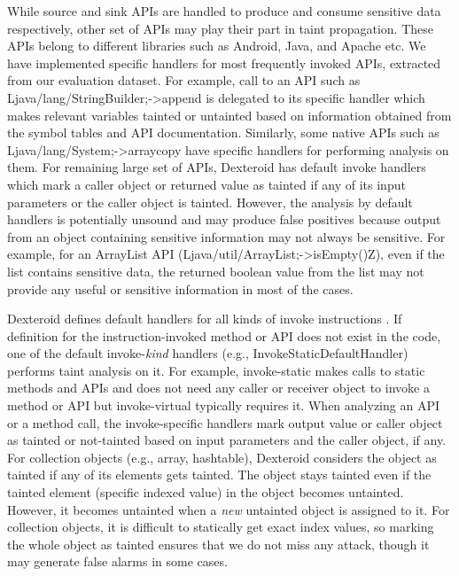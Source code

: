 \documentclass[10pt]{elsarticle}
\begin{document}
While source and sink APIs are handled to produce and consume sensitive data respectively, other set of APIs may play their part in taint propagation. These APIs belong to different libraries such as Android, Java, and Apache etc. We have implemented specific handlers for most frequently invoked APIs, extracted from our evaluation dataset. For example, call to an API such as  {\ttfamily Ljava/lang/StringBuilder;->append} is delegated to its specific handler which makes relevant variables tainted or untainted based on information obtained from the symbol tables and API documentation. Similarly, some native APIs such as {\ttfamily Ljava/lang/System;->arraycopy} have specific handlers for performing analysis on them. For remaining large set of APIs, Dexteroid has default {\ttfamily invoke} handlers which mark a caller object or returned value as tainted if any of its input parameters or the caller object is tainted. However, the analysis by default handlers is potentially unsound and may produce false positives because output from an object containing sensitive information may not always be sensitive. For example, for an {\ttfamily ArrayList} API ({\ttfamily Ljava/util/ArrayList;->isEmpty()Z}), even if the list contains sensitive data, the returned boolean value from the list may not provide any useful or sensitive information in most of the cases. 

Dexteroid defines default handlers for all kinds of {\ttfamily invoke} instructions \cite{DalvikByteCode}. If definition for the instruction-invoked method or API does not exist in the code, one of the default {\ttfamily invoke-}\emph{kind} handlers (e.g., InvokeStaticDefaultHandler) performs taint analysis on it. For example, {\ttfamily invoke-static} makes calls to static methods and APIs and does not need any caller or receiver object to invoke a method or API but {\ttfamily invoke-virtual} typically requires it. When analyzing an API or a method call, the {\ttfamily invoke}-specific handlers mark output value or caller object as tainted or not-tainted based on input parameters and the caller object, if any. For collection objects (e.g., array, hashtable), Dexteroid considers the object as tainted if any of its elements gets tainted. The object stays tainted even if the tainted element (specific indexed value) in the object becomes untainted. However, it becomes untainted when a \emph{new} untainted object is assigned to it. For collection objects, it is difficult to statically get exact index values, so marking the whole object as tainted ensures that we do not miss any attack, though it may generate false alarms in some cases.
\end{document}
